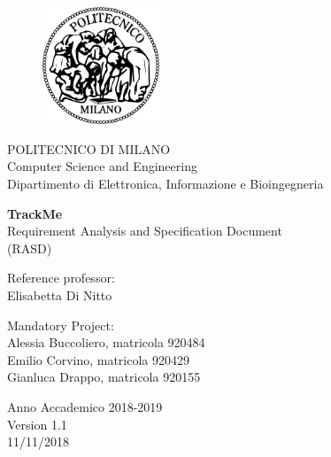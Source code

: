 \thispagestyle{empty}

\vspace*{-2.5cm} 
\bfseries{
    \begin{center}
    
    \begin{figure}[htbp]
        \begin{center}
          \includegraphics[width=3.5cm]{./pictures/logopm}
        \end{center}
      \end{figure}
    
      \large
      POLITECNICO DI MILANO\\
      \normalsize
      Computer Science and Engineering \\
      Dipartimento di Elettronica, Informazione e Bioingegneria\\
      
      \vspace*{3.3cm} \LARGE
    
      \textbf{TrackMe}\\
      
      \vspace*{.75truecm} \large
        Requirement Analysis and Specification Document \\
        (RASD)
    \end{center}

    \vspace*{2.0cm} \large
    \begin{flushleft}
    
      Reference professor: \\
      Elisabetta Di Nitto
    
    \end{flushleft}
    
    \vspace*{1.0cm}
    \begin{flushright}
    
    Mandatory Project:\\
    Alessia Buccoliero, matricola 920484\\
    Emilio Corvino, matricola 920429\\
    Gianluca Drappo, matricola 920155
    
    \end{flushright}
    
    \vspace*{0.5cm}
    \begin{center}
    
      Anno Accademico 2018-2019 \\
      
      \vspace*{0.6cm}
      Version 1.1 \\
      11/11/2018 \\
    \end{center} \clearpage
}
